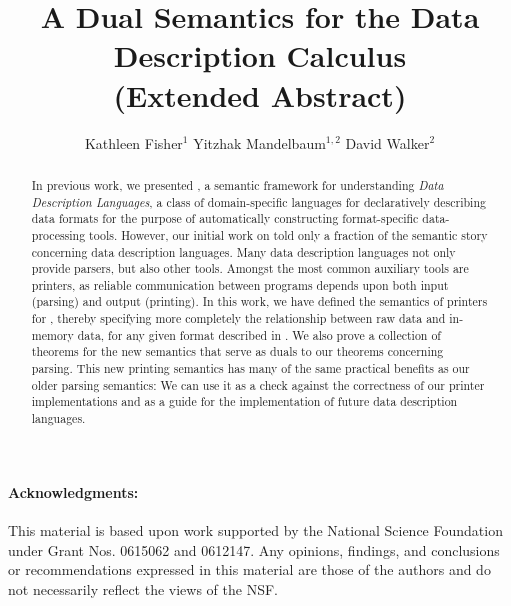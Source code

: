 \documentclass[tfpsymp,ams,pagenumbers]{tfp07symp}
\begin{document}
\title{A Dual Semantics for the Data Description Calculus\\(Extended Abstract)}
\author{Kathleen Fisher$^1$ \qquad Yitzhak Mandelbaum$^{1,2}$ \qquad David Walker$^2$}



\maketitle{}

\begin{abstract}  
  In previous work, we presented \ddc{}, a semantic framework for
  understanding {\em Data Description Languages}, a class of
  domain-specific languages for declaratively describing data formats
  for the purpose of automatically constructing format-specific
  data-processing tools.  However, our initial work on \ddc{} told
  only a fraction of the semantic story concerning data description
  languages.  Many data description languages not only provide
  parsers, but also other tools.  Amongst the most common auxiliary
  tools are printers, as reliable communication between programs
  depends upon both input (parsing) and output (printing).  In this
  work, we have defined the semantics of printers for \ddc{}, thereby
  specifying more completely the relationship between raw data and
  in-memory data, for any given format described in \ddc{}.  We also
  prove a collection of theorems for the new semantics that serve as
  duals to our theorems concerning parsing.  This new printing
  semantics has many of the same practical benefits as our older
  parsing semantics: We can use it as a check against the correctness
  of our printer implementations and as a guide for the implementation
  of future data description languages.
\end{abstract}









\paragraph*{Acknowledgments:} This material is based upon work supported by the National Science
   Foundation under Grant Nos. 0615062 and 0612147.
Any opinions, findings, and conclusions or recommendations
   expressed in this material are those of the authors and do not
   necessarily reflect the views of the NSF.

% 
% 


   
%
\end{document}
